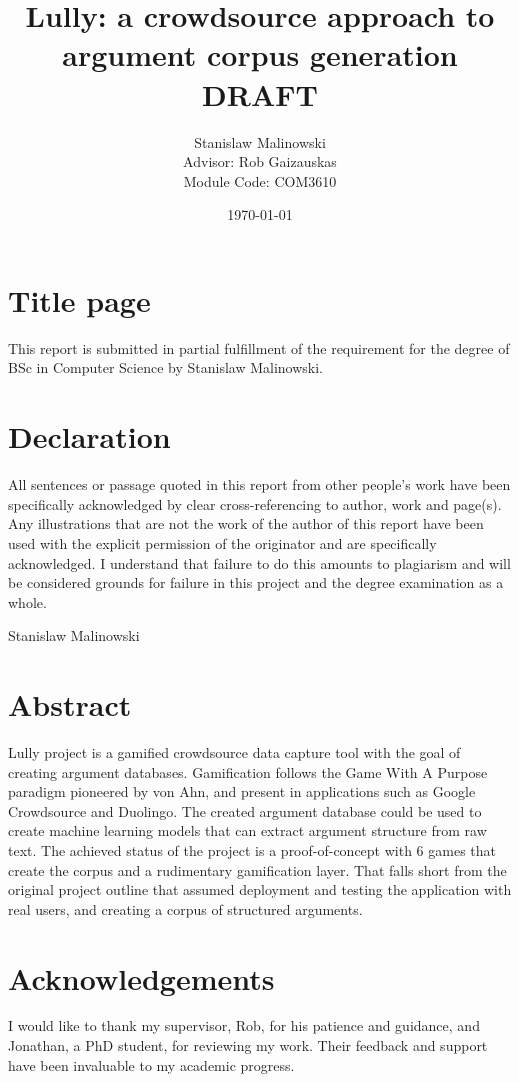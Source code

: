 \documentclass{article}
\title{Lully: a crowdsource approach to argument corpus generation DRAFT}
\author{Stanislaw Malinowski
\\[1cm]{\small Advisor: Rob Gaizauskas}
\\[1cm]{\small Module Code: COM3610}
}
\date{\today}
\begin{document}
\maketitle
\section*{Title page}
This report is submitted in partial fulfillment of the requirement for the degree of BSc in Computer Science by Stanislaw Malinowski.
\newpage

\section*{Declaration}
All sentences or passage quoted in this report from other people's work have been specifically acknowledged by clear cross-referencing to author, work and page(s). Any illustrations that are not the work of the author of this report have been used with the explicit permission of the originator and are specifically acknowledged. I understand that failure to do this amounts to plagiarism and will be considered grounds for failure in this project and the degree examination as a whole.

Stanislaw Malinowski
\newpage

\section*{Abstract}

Lully project is a gamified crowdsource data capture tool with the goal of creating argument databases. Gamification follows the Game With A Purpose paradigm pioneered by von Ahn, and present in applications such as Google Crowdsource and Duolingo. The created argument database could be used to create machine learning models that can extract argument structure from raw text.
The achieved status of the project is a proof-of-concept with 6 games that create the corpus and a rudimentary gamification layer. That falls short from the original project outline that assumed deployment and testing the application with real users, and creating a corpus of structured arguments. 

\newpage

\section*{Acknowledgements}
I would like to thank my supervisor, Rob, for his patience and guidance, and Jonathan, a PhD student, for reviewing my work. Their feedback and support have been invaluable to my academic progress.
\end{document}
